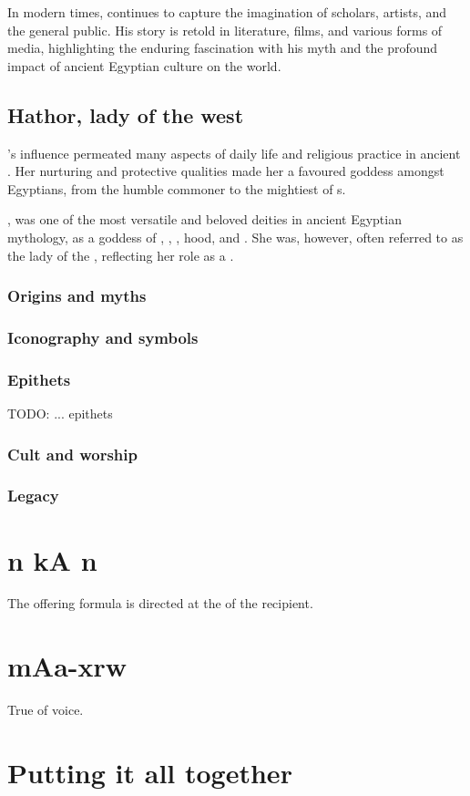 In modern times,  continues to capture the imagination of scholars, artists, and the general public. His story is retold in literature, films, and various forms of media, highlighting the enduring fascination with his myth and the profound impact of ancient Egyptian culture on the world.

\subsection*{Hathor, lady of the west}

's influence permeated many aspects of daily life and religious practice in ancient . Her nurturing and protective qualities made her a favoured goddess amongst Egyptians, from the humble commoner to the mightiest of s.

, was one of the most versatile and beloved deities in ancient Egyptian mythology, as a goddess of , , , hood, and . She was, however, often referred to as the lady of the , reflecting her role as a .

\subsubsection*{Origins and myths}

\subsubsection*{Iconography and symbols}

\subsubsection*{Epithets}

TODO: ... epithets

\subsubsection*{Cult and worship}

\subsubsection*{Legacy}

\section*{n kA n}

The offering formula is directed at the  of the recipient.

\section*{mAa-xrw}

True of voice.

\section*{Putting it all together}